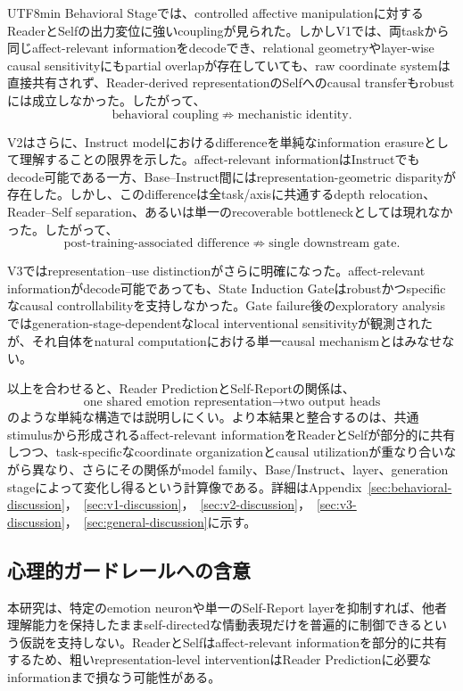 \documentclass{article} %
\begin{document}
\begin{CJK*}{UTF8}{min}
Behavioral Stageでは、controlled affective manipulationに対するReaderとSelfの出力変位に強いcouplingが見られた。しかしV1では、両taskから同じaffect-relevant informationをdecodeでき、relational geometryやlayer-wise causal sensitivityにもpartial overlapが存在していても、raw coordinate systemは直接共有されず、Reader-derived representationのSelfへのcausal transferもrobustには成立しなかった。したがって、
\[
\text{behavioral coupling}
\not\Rightarrow
\text{mechanistic identity}.
\]

V2はさらに、Instruct modelにおけるdifferenceを単純なinformation erasureとして理解することの限界を示した。affect-relevant informationはInstructでもdecode可能である一方、Base--Instruct間にはrepresentation-geometric disparityが存在した。しかし、このdifferenceは全task/axisに共通するdepth relocation、Reader--Self separation、あるいは単一のrecoverable bottleneckとしては現れなかった。したがって、
\[
\text{post-training-associated difference}
\not\Rightarrow
\text{single downstream gate}.
\]

V3ではrepresentation--use distinctionがさらに明確になった。affect-relevant informationがdecode可能であっても、State Induction Gateはrobustかつspecificなcausal controllabilityを支持しなかった。Gate failure後のexploratory analysisではgeneration-stage-dependentなlocal interventional sensitivityが観測されたが、それ自体をnatural computationにおける単一causal mechanismとはみなせない。

以上を合わせると、Reader PredictionとSelf-Reportの関係は、
\[
\text{one shared emotion representation}
\rightarrow
\text{two output heads}
\]
のような単純な構造では説明しにくい。より本結果と整合するのは、共通stimulusから形成されるaffect-relevant informationをReaderとSelfが部分的に共有しつつ、task-specificなcoordinate organizationとcausal utilizationが重なり合いながら異なり、さらにその関係がmodel family、Base/Instruct、layer、generation stageによって変化し得るという計算像である。詳細はAppendix~\ref{sec:behavioral-discussion}，~\ref{sec:v1-discussion}，~\ref{sec:v2-discussion}，~\ref{sec:v3-discussion}，~\ref{sec:general-discussion}に示す。


\subsection{心理的ガードレールへの含意}

本研究は、特定のemotion neuronや単一のSelf-Report layerを抑制すれば、他者理解能力を保持したままself-directedな情動表現だけを普遍的に制御できるという仮説を支持しない。ReaderとSelfはaffect-relevant informationを部分的に共有するため、粗いrepresentation-level interventionはReader Predictionに必要なinformationまで損なう可能性がある。


\end{CJK*}
\end{document}
